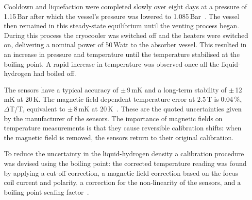 Cooldown and liquefaction were completed slowly over eight days at a pressure of 1.15\,Bar after which the vessel's pressure was lowered to 1.085\,Bar~\cite{1748-0221-13-09-T09008}. The vessel then remained in this steady-state equilibrium until the venting process began. During this process the cryocooler was switched off and the heaters were switched on, delivering a nominal power of 50\,Watt to the absorber vessel. This resulted in an increase in pressure and temperature until the temperature stabilised at the boiling point. A rapid increase in temperature was observed once all the liquid-hydrogen had boiled off.

The sensors have a typical accuracy of $\mathrm{\pm}$\,9\,mK and a long-term stability of $\mathrm{\pm}$\,12\,mK at 20\,K. The magnetic-field dependent temperature error at 2.5\,T is 0.04\,\%, $\Delta$T/T, equivalent to $\mathrm{\pm}$\,8\,mK at 20\,K~\cite{CernoxRTDs}\cite{TemperatureMeasurement}. These are the quoted uncertainties given by the manufacturer of the sensors. The importance of magnetic fields on temperature measurements is that they cause reversible calibration shifts: when the magnetic field is removed, the sensors return to their original calibration.

To reduce the uncertainty in the liquid-hydrogen density a calibration procedure was devised using the boiling point: the corrected temperature reading was found by applying a cut-off correction, a magnetic field correction based on the focus coil current and polarity, a correction for the non-linearity of the sensors, and a boiling point scaling factor~\cite{NOTE524}. 
%
%

